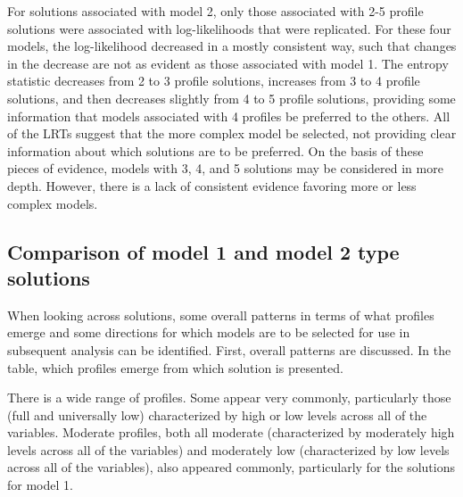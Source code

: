 \documentclass[]{book}
\theoremstyle{definition}
\theoremstyle{definition}
\theoremstyle{definition}
\theoremstyle{remark}
\begin{document}
For solutions associated with model 2, only those associated with 2-5
profile solutions were associated with log-likelihoods that were
replicated. For these four models, the log-likelihood decreased in a
mostly consistent way, such that changes in the decrease are not as
evident as those associated with model 1. The entropy statistic
decreases from 2 to 3 profile solutions, increases from 3 to 4 profile
solutions, and then decreases slightly from 4 to 5 profile solutions,
providing some information that models associated with 4 profiles be
preferred to the others. All of the LRTs suggest that the more complex
model be selected, not providing clear information about which solutions
are to be preferred. On the basis of these pieces of evidence, models
with 3, 4, and 5 solutions may be considered in more depth. However,
there is a lack of consistent evidence favoring more or less complex
models.

\subsection{Comparison of model 1 and model 2 type
solutions}\label{comparison-of-model-1-and-model-2-type-solutions}

When looking across solutions, some overall patterns in terms of what
profiles emerge and some directions for which models are to be selected
for use in subsequent analysis can be identified. First, overall
patterns are discussed. In the table, which profiles emerge from which
solution is presented.

There is a wide range of profiles. Some appear very commonly,
particularly those (full and universally low) characterized by high or
low levels across all of the variables. Moderate profiles, both all
moderate (characterized by moderately high levels across all of the
variables) and moderately low (characterized by low levels across all of
the variables), also appeared commonly, particularly for the solutions
for model 1.
\end{document}
